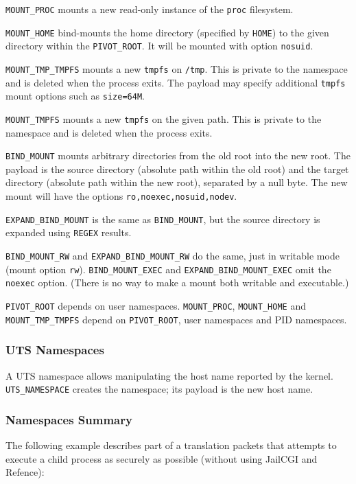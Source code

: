 \documentclass[a4paper,12pt]{article}
\begin{document}
\verb|MOUNT_PROC| mounts a new read-only instance of the \texttt{proc}
filesystem.

\verb|MOUNT_HOME| bind-mounts the home directory (specified by
\verb|HOME|) to the given directory within the \verb|PIVOT_ROOT|.  It
will be mounted with option \texttt{nosuid}.

\verb|MOUNT_TMP_TMPFS| mounts a new \texttt{tmpfs} on \texttt{/tmp}.
This is private to the namespace and is deleted when the process
exits.  The payload may specify additional \texttt{tmpfs} mount
options such as \texttt{size=64M}.

\verb|MOUNT_TMPFS| mounts a new \texttt{tmpfs} on the given path.
This is private to the namespace and is deleted when the process
exits.

\verb|BIND_MOUNT| mounts arbitrary directories from the old root into
the new root.  The payload is the source directory (absolute path
within the old root) and the target directory (absolute path within
the new root), separated by a null byte.  The new mount will have the
options \texttt{ro,noexec,nosuid,nodev}.

\verb|EXPAND_BIND_MOUNT| is the same as \verb|BIND_MOUNT|, but the
source directory is expanded using \verb|REGEX| results.

\verb|BIND_MOUNT_RW| and \verb|EXPAND_BIND_MOUNT_RW| do the same, just
in writable mode (mount option \verb|rw|).  \verb|BIND_MOUNT_EXEC| and
\verb|EXPAND_BIND_MOUNT_EXEC| omit the \verb|noexec| option.  (There
is no way to make a mount both writable and executable.)

\verb|PIVOT_ROOT| depends on user namespaces.  \verb|MOUNT_PROC|,
\verb|MOUNT_HOME| and \verb|MOUNT_TMP_TMPFS| depend on
\verb|PIVOT_ROOT|, user namespaces and PID namespaces.

\subsubsection{UTS Namespaces}

A UTS namespace allows manipulating the host name reported by the
kernel.  \verb|UTS_NAMESPACE| creates the namespace; its payload is
the new host name.

\subsubsection{Namespaces Summary}

The following example describes part of a translation packets that
attempts to execute a child process as securely as possible (without
using JailCGI and Refence):
\end{document}
